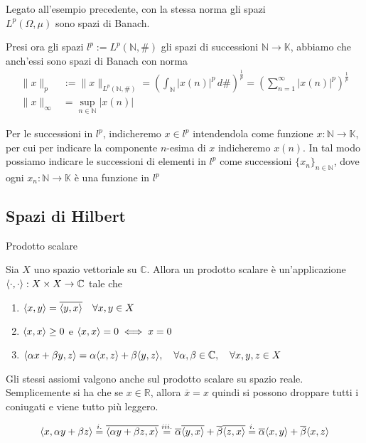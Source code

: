 \begin{example}{}
    Legato all'esempio precedente, con la stessa norma gli spazi \\\(L^{p}{(\Omega,\mu)}\) sono spazi di Banach.

    Presi ora gli spazi \(l^{p} := L^{p}{(\mathbb{N},\#)}\) gli spazi di
    successioni \(\mathbb{N}\to \mathbb{K}\), abbiamo che anch'essi sono spazi
     di Banach con norma
     \begin{align*}
         \|x\|_p &:= \|x\|_{L^{p}{(\mathbb{N}, \#)}} = {\left( \int_{\mathbb{N}} |x{(n)}|^{p} \,d\# \right)}^{\frac{1}{p}} = {\left( \sum_{n=1}^{\infty} |x{(n)}|^{p}  \right)}^{\frac{1}{p}} \\
         \|x\|_{\infty} &= \sup_{n \in \mathbb{N}} |x{(n)}|
     \end{align*}
\end{example}
\begin{note}
    Per le successioni in \(l^{p}\), indicheremo \(x \in l^{p}\)
    intendendola come funzione \(x: \mathbb{N}\to \mathbb{K}\), per cui per
    indicare la componente \(n\)-esima di \(x\) indicheremo \(x{(n)}\). In tal
    modo possiamo indicare le successioni di elementi in \(l^{p}\) come
    successioni \(\{x_{n}\}_{n \in \mathbb{N}}\), dove ogni \(x_{n}: \mathbb{N}\to \mathbb{K}\) è una funzione in \(l^{p}\) 
\end{note}

\subsection{Spazi di Hilbert}
\begin{definition}{Prodotto scalare}

    Sia \(X\) uno spazio vettoriale su \(\mathbb{C}\). Allora un prodotto
    scalare è un'applicazione \({\left\langle\cdot ,\cdot \right\rangle} : X\times X \to \mathbb{C}\) tale che
\begin{enumerate}[label = \roman*.]
    \item \({\left\langle x,y\right\rangle} = \overline{{\left\langle y,x\right\rangle} } \quad \forall x,y \in X\) 
    \item \({\left\langle x,x\right\rangle} \ge 0\) e \({\left\langle x,x\right\rangle} = 0 \iff x = 0\) 
    \item \({\left\langle\alpha x + \beta y, z\right\rangle} = \alpha {\left\langle x,z\right\rangle} + \beta {\left\langle y,z\right\rangle}, \quad \forall \alpha,\beta \in \mathbb{C}, \quad \forall x,y,z \in X \)
\end{enumerate}
\end{definition}
\begin{remark}{}
    Gli stessi assiomi valgono anche sul prodotto scalare su spazio reale.
    Semplicemente si ha che se \(x \in \mathbb{R}\), allora \(\overline{x} = x\) quindi si possono droppare tutti i coniugati e viene tutto più leggero.
\end{remark}
\begin{note}
    \[
      {\left\langle x, \alpha y + \beta z\right\rangle} \overset{i.}{=} \overline{{\left\langle\alpha y + \beta z, x\right\rangle} } \overset{iii.}{=} \overline{\alpha} \overline{{\left\langle y,x\right\rangle} } + \overline{\beta}\overline{{\left\langle z,x\right\rangle} } \overset{i.}{=}
      \overline{\alpha} {\left\langle x,y\right\rangle} + \overline{\beta}{\left\langle x,z\right\rangle} 
    \]
\end{note}

